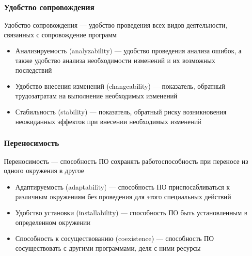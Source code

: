 \documentclass{../industrial-development}
\begin{document}
	\begin{frame} \frametitle {Удобство сопровождения}
		\begin{block}{}
			\alert{Удобство сопровождения} --- удобство проведения всех видов деятельности, связанных с сопровождение программ
		\end{block}
		\begin{itemize}
			\item Анализируемость (analyzability) --- удобство проведения анализа ошибок, а также удобство анализа необходимости изменений и их возможных последствий
			\item Удобство внесения изменений (changeability) --- показатель, обратный трудозатратам на выполнение необходимых изменений
			\item Стабильность (stability) --- показатель, обратный риску возникновения неожиданных эффектов при внесении необходимых изменений
		\end{itemize}
	\end{frame}	
	
	\begin{frame} \frametitle {Переносимость}
		\begin{block}{}
			\alert{Переносимость} --- способность ПО сохранять работоспособность при переносе из одного окружения в другое
		\end{block}
		\begin{itemize}
			\item Адаптируемость (adaptability) --- способность ПО приспосабливаться к различным окружениям без проведения для этого специальных действий
			\item Удобство установки (installability) --- способность ПО быть установленным в определенном окружении
			\item Способность к сосуществованию (coexistence) --- способность ПО сосуществовать с другими программами, деля с ними ресурсы
		\end{itemize}
	\end{frame}	
	
\end{document}

